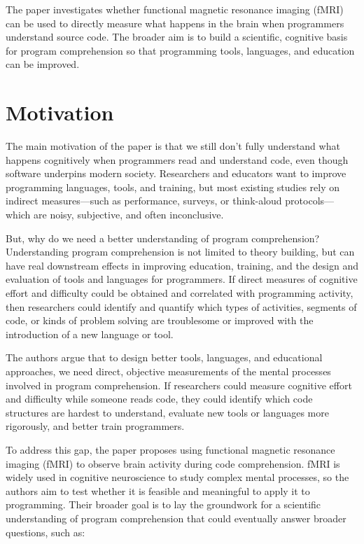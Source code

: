 The paper investigates whether functional magnetic resonance imaging (fMRI) can be used to directly measure what happens in the brain when programmers understand source code. The broader aim is to build a scientific, cognitive basis for program comprehension so that programming tools, languages, and education can be improved.

\section{Motivation}

The main motivation of the paper is that we still don’t fully understand what happens cognitively when programmers read and understand code, even though software underpins modern society. Researchers and educators want to improve programming languages, tools, and training, but most existing studies rely on indirect measures—such as performance, surveys, or think-aloud protocols—which are noisy, subjective, and often inconclusive.

But, why do we need a better understanding of program comprehension? Understanding program comprehension is not limited to theory building, but can have real downstream effects in improving education, training, and the design and evaluation of tools and languages for programmers. If direct measures of cognitive effort and difficulty could be obtained and correlated with programming activity, then researchers could identify and quantify which types of activities, segments of code, or kinds of problem solving are troublesome or improved with the introduction of a new language or tool.

The authors argue that to design better tools, languages, and educational approaches, we need direct, objective measurements of the mental processes involved in program comprehension. If researchers could measure cognitive effort and difficulty while someone reads code, they could identify which code structures are hardest to understand, evaluate new tools or languages more rigorously, and better train programmers.

To address this gap, the paper proposes using functional magnetic resonance imaging (fMRI) to observe brain activity during code comprehension. fMRI is widely used in cognitive neuroscience to study complex mental processes, so the authors aim to test whether it is feasible and meaningful to apply it to programming. Their broader goal is to lay the groundwork for a scientific understanding of program comprehension that could eventually answer broader questions, such as:

